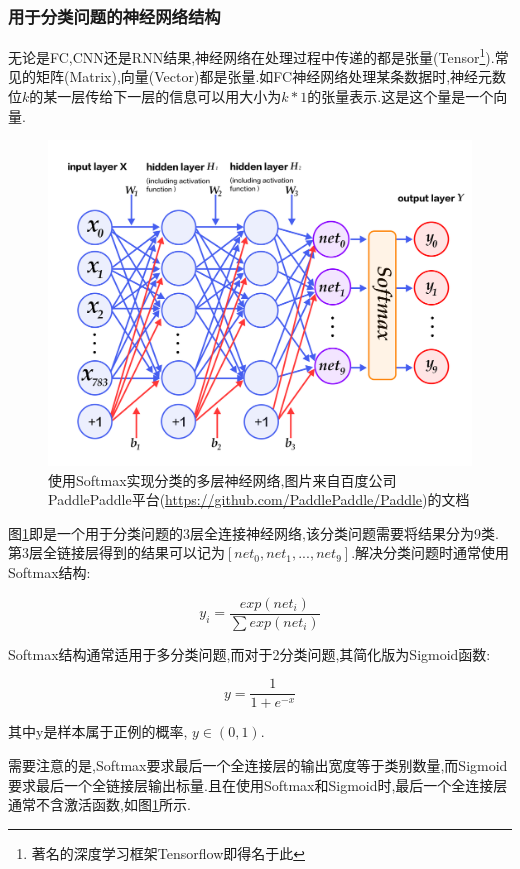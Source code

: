 \subsubsection{用于分类问题的神经网络结构}
\par
无论是FC,CNN还是RNN结果,神经网络在处理过程中传递的都是张量(Tensor\footnote{著名的深度学习框架Tensorflow\supercite{abadi2016tensorflow}即得名于此}).常见的矩阵(Matrix),向量(Vector)都是张量.如FC神经网络处理某条数据时,神经元数位$k$的某一层传给下一层的信息可以用大小为$k*1$的张量表示.这是这个量是一个向量.
\par
\begin{figure}[htbp!]
    \centering
    \includegraphics[width = 1.\textwidth]{chap/img/mlp_paddle.png}
    \caption{
        使用Softmax实现分类的多层神经网络,图片来自百度公司PaddlePaddle平台(\url{https://github.com/PaddlePaddle/Paddle})的文档\supercite{recognize_digits_paddle}
        }\label{fig:mlp_paddle}
\end{figure}
\par
图\ref{fig:mlp_paddle}即是一个用于分类问题的3层全连接神经网络,该分类问题需要将结果分为9类.第3层全链接层得到的结果可以记为$[net_0,net_1,...,net_9]$.解决分类问题时通常使用Softmax结构:
\par
\begin{equation} y_i = \frac{exp(net_i)}{\sum{ exp(net_i) }}  \end{equation}
\par
Softmax结构通常适用于多分类问题,而对于2分类问题,其简化版为Sigmoid函数:
\par
\begin{equation} y = \frac{1}{1+e^{-x}}  \end{equation}
\par
其中y是样本属于正例的概率, $y\in (0,1)$.
\par
需要注意的是,Softmax要求最后一个全连接层的输出宽度等于类别数量,而Sigmoid要求最后一个全链接层输出标量.且在使用Softmax和Sigmoid时,最后一个全连接层通常不含激活函数,如图\ref{fig:mlp_paddle}所示.

